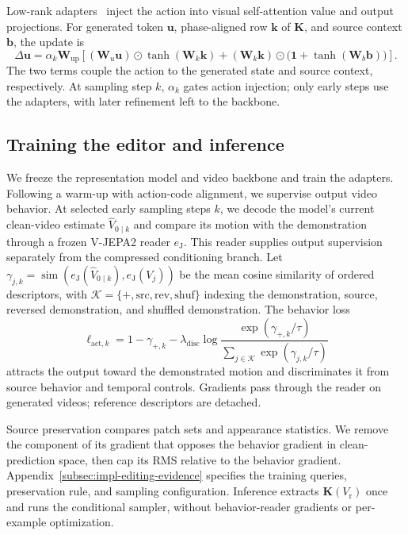 Low-rank adapters~\citep{hu2022lora} inject the action into visual
self-attention value and output projections. For generated token $\mathbf u$, phase-aligned row $\mathbf k$ of $\mathbf K$, and source context $\mathbf b$, the update is
\begin{equation}
 \Delta \mathbf u=\alpha_k \mathbf W_{\mathrm{up}}\!\left[
  (\mathbf W_u \mathbf u)\odot\tanh(\mathbf W_k \mathbf k)
  +(\mathbf W_k \mathbf k)\odot\bigl(\mathbf 1+\tanh(\mathbf W_b \mathbf b)\bigr)\right].
 \label{eq:method-adapter}
\end{equation}
The two terms couple the action to the generated state and source context,
respectively. At sampling step $k$, $\alpha_k$ gates action injection;
only early steps use the adapters, with later refinement left to the backbone.

\subsection{Training the editor and inference}
\label{subsec:method-training}

We freeze the representation model and video backbone and train the
adapters. Following a warm-up with action-code alignment, we supervise
output video behavior. At selected early sampling steps $k$, we decode the model's
current clean-video estimate $\widehat V_{0\mid k}$ and compare its motion
with the demonstration through a frozen V-JEPA2 reader $e_{\mathrm J}$.
This reader supplies output supervision separately from the compressed
conditioning branch. Let
$\gamma_{j,k}=\operatorname{sim}(e_{\mathrm J}(\widehat V_{0\mid k}),e_{\mathrm J}(V_j))$
be the mean cosine similarity of ordered descriptors, with
$\mathcal K=\{+,\mathrm{src},\mathrm{rev},\mathrm{shuf}\}$ indexing the
demonstration, source, reversed demonstration, and shuffled demonstration.
The behavior loss
\begin{equation}
 \ell_{\mathrm{act},k}=1-\gamma_{+,k}
  -\lambda_{\mathrm{disc}}\log
   \frac{\exp(\gamma_{+,k}/\tau)}
        {\sum_{j\in\mathcal K}\exp(\gamma_{j,k}/\tau)}
 \label{eq:method-behavior-loss}
\end{equation}
attracts the output toward the demonstrated motion and discriminates it
from source behavior and temporal controls. Gradients pass through the
reader on generated videos; reference descriptors are detached.

Source preservation compares patch sets and appearance statistics.
We remove the component of its gradient that opposes the behavior gradient
in clean-prediction space, then cap its RMS relative to the behavior gradient.
Appendix~\ref{subsec:impl-editing-evidence} specifies the training queries,
preservation rule, and sampling configuration.
Inference extracts $\mathbf K(V_{\mathrm r})$ once and runs the conditional
sampler, without behavior-reader gradients or per-example optimization.
